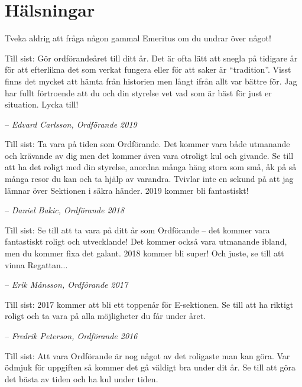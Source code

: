 \documentclass[10pt]{article}
\begin{document}
    \newpage
    
    \section{Hälsningar}
    
    Tveka aldrig att fråga någon gammal Emeritus om du undrar över något!
    
    \vspace{1ex}
    
    Till sist: Gör ordförandeåret till ditt år. Det är ofta lätt att snegla på tidigare år för att efterlikna det som verkat fungera eller för att saker är ``tradition''. Visst finns det mycket att hämta från historien men långt ifrån allt var bättre för. Jag har fullt förtroende att du och din styrelse vet vad som är bäst för just er situation. Lycka till!

    -- \emph{Edvard Carlsson, Ordförande 2019}
    \vspace*{1ex}
    
    Till sist: Ta vara på tiden som Ordförande. Det kommer vara både utmanande och krävande av dig men det kommer även vara otroligt kul och givande. Se till att ha det roligt med din styrelse, anordna många häng stora som små, åk på så många resor du kan och ta hjälp av varandra. Tvivlar inte en sekund på att jag lämnar över Sektionen i säkra händer. 2019 kommer bli fantastiskt!

    -- \emph{Daniel Bakic, Ordförande 2018}
    \vspace*{1ex}
    
    Till sist: Se till att ta vara på ditt år som Ordförande -- det kommer vara fantastiskt roligt och utvecklande! Det kommer också vara utmanande ibland, men du kommer fixa det galant. 2018 kommer bli super! Och juste, se till att vinna Regattan...
    
    -- \emph{Erik Månsson, Ordförande 2017}
    
    \vspace*{1ex}
    
    Till sist: 2017 kommer att bli ett toppenår för E-sektionen. Se till att ha riktigt roligt och ta vara på alla möjligheter du får under året.
    
    -- \emph{Fredrik Peterson, Ordförande 2016}
    
    \vspace*{1ex}
    
    Till sist: Att vara Ordförande är nog något av det roligaste man kan göra. Var ödmjuk för uppgiften så kommer det gå väldigt bra under dit år. Se till att göra det bästa av tiden och ha kul under tiden.
    
\end{document}
